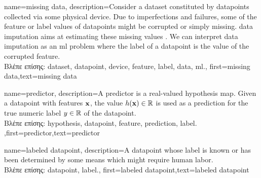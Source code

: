 {name={missing data},
	description={Consider a \gls{dataset} constituted by \gls{datapoint}s collected via 
		some physical \gls{device}. Due to imperfections and failures, some of the \gls{feature} 
		or \gls{label} values of \gls{datapoint}s might be corrupted or simply missing. 
		\Gls{data} imputation aims at estimating these missing values \cite{Abayomi2008DiagnosticsFM}. 
		We can interpret \gls{data} imputation as an \gls{ml} problem where the \gls{label} of a \gls{datapoint} is 
		the value of the corrupted \gls{feature}.\\
		\foreignlanguage{greek}{Βλέπε επίσης:} \gls{dataset}, \gls{datapoint}, \gls{device}, \gls{feature}, \gls{label}, \gls{data}, \gls{ml}.},
	first={missing data},text={missing data}  
}

{name={predictor},
	description={A predictor is a real-valued \gls{hypothesis} map. 
		Given a \gls{datapoint} with \gls{feature}s ${\bf x}$, the value 
		$h({\bf x}) \in \mathbb{R}$ is used as a \gls{prediction} for the true 
		numeric \gls{label} $y \in \mathbb{R}$ of the \gls{datapoint}.\\
		\foreignlanguage{greek}{Βλέπε επίσης:} \gls{hypothesis}, \gls{datapoint}, \gls{feature}, \gls{prediction}, \gls{label}.
		},first={predictor},text={predictor}  
}

{name={labeled datapoint},
 description={A \gls{datapoint} whose \gls{label} is known or has been determined 
 	by some means which might require human labor.\\
	\foreignlanguage{greek}{Βλέπε επίσης:} \gls{datapoint}, \gls{label}.},
 first={labeled datapoint},text={labeled datapoint}  
}
 
